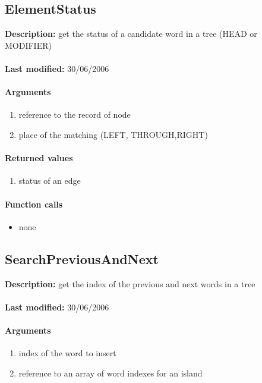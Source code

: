 \subsection{ElementStatus}
\textbf{Description:} get the status of a candidate word in a tree (HEAD or MODIFIER)\\
\\\textbf{Last modified:} 30/06/2006

\paragraph{Arguments}
\begin{enumerate}
\item reference to the record of node
\item place of the matching (LEFT, THROUGH,RIGHT)
\end{enumerate}

\paragraph{Returned values}
\begin{enumerate}
\item status of an edge
\end{enumerate}

\paragraph{Function calls}
\begin{itemize}
\item none
\end{itemize}

\subsection{SearchPreviousAndNext}
\textbf{Description:} get the index of the previous and next words in a tree\\
\\\textbf{Last modified:} 30/06/2006

\paragraph{Arguments}
\begin{enumerate}
\item index of the word to insert
\item reference to an array of word indexes for an island
\end{enumerate}

